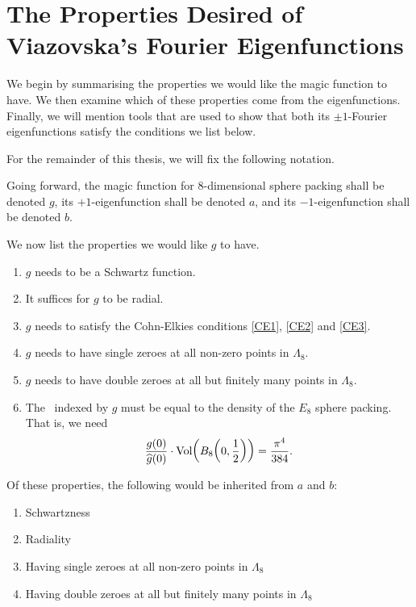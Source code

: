 \section{The Properties Desired of Viazovska's Fourier Eigenfunctions}
\label{Ch3:Sec:Properties}

We begin by summarising the properties we would like the magic function to have. We then examine which of these properties come from the eigenfunctions. Finally, we will mention tools that are used to show that both its $\pm 1$-Fourier eigenfunctions satisfy the conditions we list below.

For the remainder of this thesis, we will fix the following notation.

\begin{boxnotation}
    Going forward, the magic function for $8$-dimensional sphere packing shall be denoted $g$, its $+1$-eigenfunction shall be denoted $a$, and its $-1$-eigenfunction shall be denoted $b$.
\end{boxnotation}

We now list the properties we would like $g$ to have.

\begin{enumerate}
    \item $g$ needs to be a Schwartz function.
    \item It suffices for $g$ to be radial.
    \item $g$ needs to satisfy the Cohn-Elkies conditions \ref{CE1}, \ref{CE2} and \ref{CE3}.
    \item $g$ needs to have single zeroes at all non-zero points in $\Lambda_8$.
    \item $g$ needs to have double zeroes at all but finitely many points in $\Lambda_8$.
    \item The \CELP\ indexed by $g$ must be equal to the density of the $E_8$ sphere packing. That is, we need
    \begin{align*}
        \frac{g(0)}{\widehat{g}(0)} \cdot \operatorname{Vol}\!\left( B_8\!\left( 0, \frac{1}{2} \right) \right) = \frac{\pi^4}{384}.
    \end{align*}
\end{enumerate}

Of these properties, the following would be inherited from $a$ and $b$:

\begin{enumerate}
    \item Schwartzness
    \item Radiality
    \item Having single zeroes at all non-zero points in $\Lambda_8$
    \item Having double zeroes at all but finitely many points in $\Lambda_8$
\end{enumerate}

